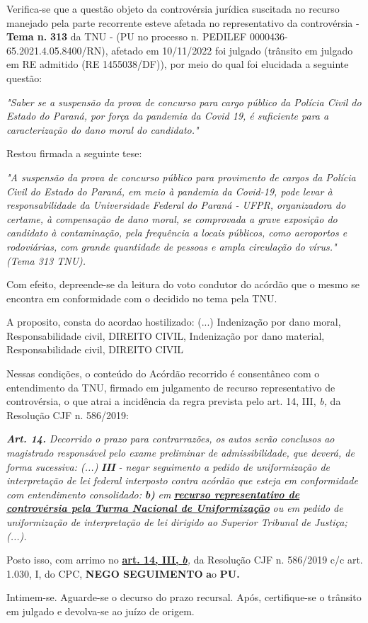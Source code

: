 \documentclass[12pt]{article}
\begin{document}
\justifying
\noindent Verifica-se que a questão objeto da controvérsia jurídica suscitada no recurso manejado pela parte recorrente esteve afetada no representativo da controvérsia - \textbf{Tema n. }\textbf{313} da TNU - (PU no processo n. PEDILEF 0000436-65.2021.4.05.8400/RN),  afetado em 10/11/2022 foi julgado (trânsito em julgado em RE admitido (RE 1455038/DF)), por meio do qual foi elucidada a seguinte questão:

\noindent \textit{"Saber se a suspensão da prova de concurso para cargo público da Polícia Civil do Estado do Paraná, por força da pandemia da Covid 19, é suficiente para a caracterização do dano moral do candidato."}

\noindent Restou firmada a seguinte tese:

\noindent \textit{"A suspensão da prova de concurso público para provimento de cargos da Polícia Civil do Estado do Paraná, em meio à pandemia da Covid-19, pode levar à responsabilidade da Universidade Federal do Paraná - UFPR, organizadora do certame, à compensação de dano moral, se comprovada a grave exposição do candidato à contaminação, pela frequência a locais públicos, como aeroportos e rodoviárias, com grande quantidade de pessoas e ampla circulação do vírus." (Tema 313 TNU).}

\noindent Com efeito, depreende-se da leitura do voto condutor do acórdão que o mesmo se encontra em conformidade com o decidido no  tema pela TNU.

\noindent A proposito, consta do acordao hostilizado: (...) Indenização por dano moral, Responsabilidade civil, DIREITO CIVIL, Indenização por dano material, Responsabilidade civil, DIREITO CIVIL

\noindent Nessas condições, o conteúdo do Acórdão recorrido é consentâneo com o entendimento da TNU, firmado em julgamento de recurso representativo de controvérsia, o que atrai a incidência da regra prevista pelo art. 14, III, \textit{b,} da Resolução CJF n. 586/2019:

\noindent \textit{\textbf{Art. 14.}}\textit{ Decorrido o prazo para contrarrazões, os autos serão conclusos ao magistrado responsável pelo exame preliminar de admissibilidade, que deverá, de forma sucessiva: (...) }\textit{\textbf{III }}\textit{- negar seguimento a pedido de uniformização de interpretação de lei federal interposto contra acórdão que esteja em conformidade com entendimento consolidado: }\textit{\textbf{b)}}\textit{ em }\uline{\textit{\textbf{recurso representativo de controvérsia pela Turma Nacional de Uniformização}}}\textit{ ou em pedido de uniformização de interpretação de lei dirigido ao Superior Tribunal de Justiça;(...).}

\noindent Posto isso, com arrimo no \uline{\textbf{art. 14, III, }}\uline{\textit{\textbf{b}}}\textit{,} da Resolução CJF n. 586/2019 c/c art. 1.030, I, do CPC, \textbf{NEGO SEGUIMENTO }\textbf{a}o\textbf{ PU}\textbf{.}

\noindent Intimem-se. Aguarde-se o decurso do prazo recursal. Após, certifique-se o trânsito em julgado e devolva-se ao juízo de origem.
\end{document}
